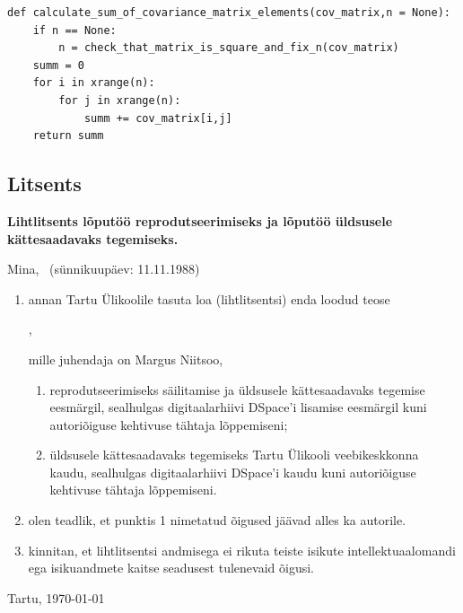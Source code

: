 \documentclass[a4paper,12pt,oneside]{article}
\newenvironment{customFloatWrap}{}{}
\numberwithin{equation}{section}
\theoremstyle{definition}
\begin{document}
\begin{subappendices}
\begin{customFloatWrap}
\begin{verbatim}
def calculate_sum_of_covariance_matrix_elements(cov_matrix,n = None):
    if n == None:
        n = check_that_matrix_is_square_and_fix_n(cov_matrix)
    summ = 0
    for i in xrange(n):
        for j in xrange(n):
            summ += cov_matrix[i,j]
    return summ

\end{verbatim}
\end{customFloatWrap}

\pagebreak 

\subsection{Litsents}

\textbf{Lihtlitsents lõputöö reprodutseerimiseks ja
lõputöö üldsusele kätte\-saadavaks tegemiseks.}


Mina, \@author\ (sünnikuupäev: 11.11.1988)
\begin{enumerate}
\item annan Tartu Ülikoolile tasuta loa (lihtlitsentsi)
enda loodud teose
\begin{center}
\@title,
\end{center}
mille juhendaja on Margus Niitsoo,
\begin{enumerate}
\item reprodutseerimiseks säilitamise ja üldsusele
kättesaadavaks tegemise eesmärgil, sealhulgas
digitaalarhiivi DSpace'i lisamise eesmärgil kuni
autoriõiguse kehtivuse tähtaja lõppemiseni;
\item üldsusele kättesaadavaks tegemiseks Tartu Ülikooli
veebikeskkonna kaudu, sealhulgas digitaalarhiivi
DSpace'i kaudu kuni autoriõiguse kehti\-vuse tähtaja lõppemiseni.
\end{enumerate}
\item olen teadlik, et punktis 1 nimetatud õigused jäävad
alles ka autorile.
\item kinnitan, et lihtlitsentsi andmisega ei rikuta teiste
isikute intellektuaal\-o\-mandi ega isikuandmete kaitse
seadusest tulenevaid õigusi.
\end{enumerate}

\vfill

\begin{center}
Tartu,  \today
\end{center}
\makeatother

\end{subappendices}
\end{document}

